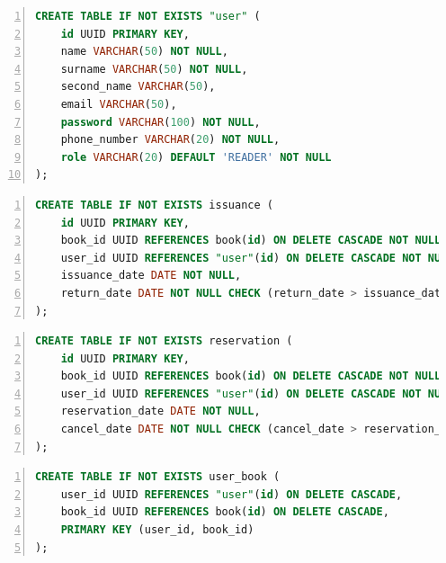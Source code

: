 \begin{center}
	\captionsetup{justification=raggedright,singlelinecheck=off}
	\begin{lstlisting}[language=sql, frame=single, numbers=left, caption=Создание таблицы user]
CREATE TABLE IF NOT EXISTS "user" (
	id UUID PRIMARY KEY,
	name VARCHAR(50) NOT NULL,
	surname VARCHAR(50) NOT NULL,
	second_name VARCHAR(50),
	email VARCHAR(50),
	password VARCHAR(100) NOT NULL,
	phone_number VARCHAR(20) NOT NULL,
	role VARCHAR(20) DEFAULT 'READER' NOT NULL
);
	\end{lstlisting}
\end{center}

\begin{center}
	\captionsetup{justification=raggedright,singlelinecheck=off}
	\begin{lstlisting}[language=sql, frame=single, numbers=left, caption=Создание таблицы issuance]
CREATE TABLE IF NOT EXISTS issuance (
	id UUID PRIMARY KEY,
	book_id UUID REFERENCES book(id) ON DELETE CASCADE NOT NULL,
	user_id UUID REFERENCES "user"(id) ON DELETE CASCADE NOT NULL,
	issuance_date DATE NOT NULL,
	return_date DATE NOT NULL CHECK (return_date > issuance_date)
);
	\end{lstlisting}
\end{center}

\begin{center}
	\captionsetup{justification=raggedright,singlelinecheck=off}
	\begin{lstlisting}[language=sql, frame=single, numbers=left, caption=Создание таблицы reservation]
CREATE TABLE IF NOT EXISTS reservation (
	id UUID PRIMARY KEY,
	book_id UUID REFERENCES book(id) ON DELETE CASCADE NOT NULL,
	user_id UUID REFERENCES "user"(id) ON DELETE CASCADE NOT NULL,
	reservation_date DATE NOT NULL,
	cancel_date DATE NOT NULL CHECK (cancel_date > reservation_date)
);
	\end{lstlisting}
\end{center}

\begin{center}
	\captionsetup{justification=raggedright,singlelinecheck=off}
	\begin{lstlisting}[language=sql, frame=single, numbers=left, caption=Создание таблицы favorite]
CREATE TABLE IF NOT EXISTS user_book (
	user_id UUID REFERENCES "user"(id) ON DELETE CASCADE,
	book_id UUID REFERENCES book(id) ON DELETE CASCADE,
	PRIMARY KEY (user_id, book_id)
);
	\end{lstlisting}
\end{center}

